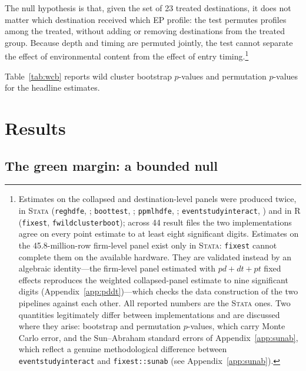 \documentclass[12pt]{article}
\begin{document}
The null hypothesis is that, given the set of 23 treated destinations, it does not
matter which destination received which EP profile: the test permutes profiles
among the treated, without adding or removing destinations from the treated group.
Because depth and timing are permuted jointly, the test cannot separate the effect
of environmental content from the effect of entry timing.\footnote{Estimates on the collapsed and destination-level panels were produced twice, in \textsc{Stata}
(\texttt{reghdfe}, \citealp{correia2017}; \texttt{boottest},
\citealp{roodman2019}; \texttt{ppmlhdfe}, \citealp{correia2020};
\texttt{eventstudyinteract}, \citealp{sun2021}) and in \textsc{R}
(\texttt{fixest}, \texttt{fwildclusterboot}); across 44 result files the two implementations agree on every point estimate to at least
eight significant digits. Estimates on the 45.8-million-row firm-level panel exist only in \textsc{Stata}: \texttt{fixest} cannot complete them on the available hardware. They are validated instead by an algebraic identity---the firm-level panel estimated with $pd+dt+pt$ fixed effects reproduces the weighted collapsed-panel estimate to nine significant digits (Appendix~\ref{app:pddt})---which checks the data construction of the two pipelines against each other. All reported numbers are the \textsc{Stata}
ones. Two quantities
legitimately differ between implementations and are discussed where they arise:
bootstrap and permutation $p$-values, which carry Monte Carlo error, and the
Sun--Abraham standard errors of Appendix~\ref{app:sunab}, which reflect a genuine
methodological difference between \texttt{eventstudyinteract} and
\texttt{fixest::sunab} (see Appendix~\ref{app:sunab}).}

Table~\ref{tab:wcb} reports wild cluster bootstrap $p$-values and permutation $p$-values for the headline estimates.



\section{Results}\label{sec:results}

\subsection{The green margin: a bounded null}\label{sec:green}
\end{document}
